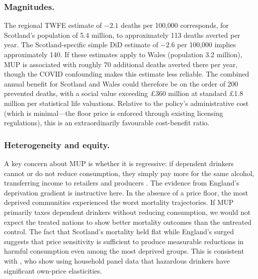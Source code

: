 \documentclass[12pt]{article}
\begin{document}
\subsubsection*{Magnitudes.} The regional TWFE estimate of $-2.1$ deaths per 100,000 corresponds, for Scotland's population of 5.4 million, to approximately 113 deaths averted per year. The Scotland-specific simple DiD estimate of $-2.6$ per 100,000 implies approximately 140. If these estimates apply to Wales (population 3.2 million), MUP is associated with roughly 70 additional deaths averted there per year, though the COVID confounding makes this estimate less reliable. The combined annual benefit for Scotland and Wales could therefore be on the order of 200 prevented deaths, with a social value exceeding \pounds{}360 million at standard \pounds{}1.8 million per statistical life valuations. Relative to the policy's administrative cost (which is minimal---the floor price is enforced through existing licensing regulations), this is an extraordinarily favourable cost-benefit ratio.

\subsubsection*{Heterogeneity and equity.} A key concern about MUP is whether it is regressive: if dependent drinkers cannot or do not reduce consumption, they simply pay more for the same alcohol, transferring income to retailers and producers \citep{Chetty2009}. The evidence from England's deprivation gradient is instructive here. In the absence of a price floor, the most deprived communities experienced the worst mortality trajectories. If MUP primarily taxes dependent drinkers without reducing consumption, we would not expect the treated nations to show better mortality outcomes than the untreated control. The fact that Scotland's mortality held flat while England's surged suggests that price sensitivity is sufficient to produce measurable reductions in harmful consumption even among the most deprived groups. This is consistent with \citet{Meng2014}, who show using household panel data that hazardous drinkers have significant own-price elasticities.
\end{document}

